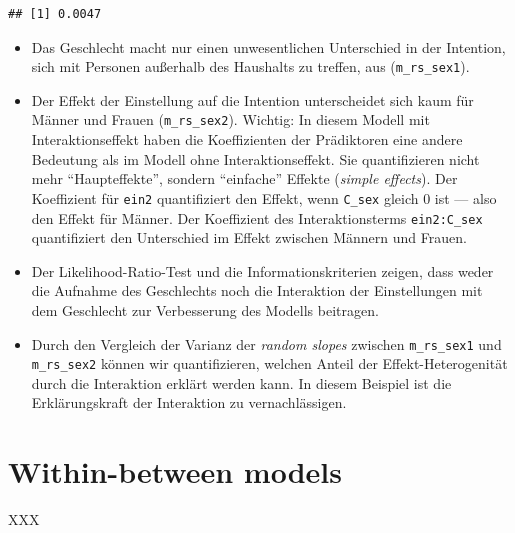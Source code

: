\documentclass[
]{book}
\providecommand{\tightlist}{%
  \setlength{\itemsep}{0pt}\setlength{\parskip}{0pt}}
\begin{document}
\begin{verbatim}
## [1] 0.0047
\end{verbatim}

\begin{itemize}
\tightlist
\item
  Das Geschlecht macht nur einen unwesentlichen Unterschied in der Intention, sich mit Personen außerhalb des Haushalts zu treffen, aus (\texttt{m\_rs\_sex1}).
\item
  Der Effekt der Einstellung auf die Intention unterscheidet sich kaum für Männer und Frauen (\texttt{m\_rs\_sex2}). Wichtig: In diesem Modell mit Interaktionseffekt haben die Koeffizienten der Prädiktoren eine andere Bedeutung als im Modell ohne Interaktionseffekt. Sie quantifizieren nicht mehr ``Haupteffekte'', sondern ``einfache'' Effekte (\emph{simple effects}). Der Koeffizient für \texttt{ein2} quantifiziert den Effekt, wenn \texttt{C\_sex} gleich 0 ist --- also den Effekt für Männer. Der Koeffizient des Interaktionsterms \texttt{ein2:C\_sex} quantifiziert den Unterschied im Effekt zwischen Männern und Frauen.
\item
  Der Likelihood-Ratio-Test und die Informationskriterien zeigen, dass weder die Aufnahme des Geschlechts noch die Interaktion der Einstellungen mit dem Geschlecht zur Verbesserung des Modells beitragen.
\item
  Durch den Vergleich der Varianz der \emph{random slopes} zwischen \texttt{m\_rs\_sex1} und \texttt{m\_rs\_sex2} können wir quantifizieren, welchen Anteil der Effekt-Heterogenität durch die Interaktion erklärt werden kann. In diesem Beispiel ist die Erklärungskraft der Interaktion zu vernachlässigen.
\end{itemize}

\hypertarget{within-between-models}{%
\chapter{Within-between models}\label{within-between-models}}

XXX

  
\end{document}
